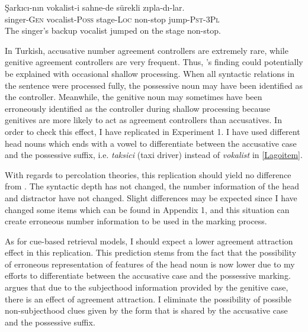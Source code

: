 \documentclass[doc]{apa6}
\begin{document}
\begin{exe}
\ex \label{Lagoitem}
\gll \c{S}ark{\i}c{\i}-n{\i}n vokalist-i sahne-de s\"{u}rekli z{\i}pla-d{\i}-lar.\\
singer-\textsc{Gen} vocalist-\textsc{Poss} stage-\textsc{Loc} non-stop jump-\textsc{Pst}-\textsc{3Pl}\\
\glt The singer's backup vocalist jumped on the stage non-stop.
\end{exe}

In Turkish, accusative number agreement controllers are extremely rare, while genitive agreement controllers are very frequent. Thus, \textcite{Lago2018}'s finding could potentially be explained with occasional shallow processing. When all syntactic relations in the sentence were processed fully, the possessive noun may have been identified as the controller. Meanwhile, the genitive noun may sometimes have been erroneously identified as the controller during shallow processing because genitives are more likely to act as agreement controllers than accusatives. In order to check this effect, I have replicated \textcite{Lago2018} in Experiment 1. I have used different head nouns which ends with a vowel to differentiate between the accusative case and the possessive suffix, i.e. \emph{taksici} (taxi driver) instead of \emph{vokalist} in \autoref{Lagoitem}.

With regards to percolation theories, this replication should yield no difference from \textcite{Lago2018}. The syntactic depth has not changed, the number information of the head and distractor have not changed. Slight differences may be expected since I have changed some items which can be found in Appendix 1, and this situation can create erroneous number information to be used in the marking process.

As for cue-based retrieval models, I should expect a lower agreement attraction effect in this replication. This prediction stems from the fact that the possibility of erroneous representation of features of the head noun is now lower due to my efforts to differentiate between the accusative case and the possessive marking. \textcite{Lago2018} argues that due to the subjecthood information provided by the genitive case, there is an effect of agreement attraction. I eliminate the possibility of possible non-subjecthood clues given by the form that is shared by the accusative case and the possessive suffix.
\end{document}
